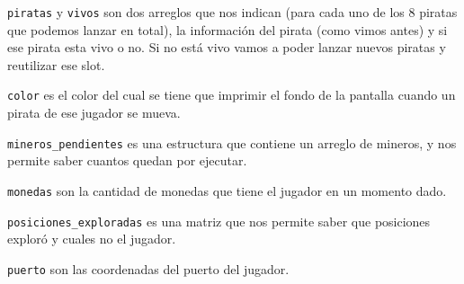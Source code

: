 \texttt{piratas} y \texttt{vivos} son dos arreglos que nos indican (para cada uno de los 8 piratas que podemos lanzar en total), la información del pirata (como vimos antes) y si ese pirata esta vivo o no. Si no está vivo vamos a poder lanzar nuevos piratas y reutilizar ese slot.

\texttt{color} es el color del cual se tiene que imprimir el fondo de la pantalla cuando un pirata de ese jugador se mueva.

\texttt{mineros_pendientes} es una estructura que contiene un arreglo de mineros, y nos permite saber cuantos quedan por ejecutar.

\texttt{monedas} son la cantidad de monedas que tiene el jugador en un momento dado.

\texttt{posiciones_exploradas} es una matriz que nos permite saber que posiciones exploró y cuales no el jugador.

\texttt{puerto} son las coordenadas del puerto del jugador.


